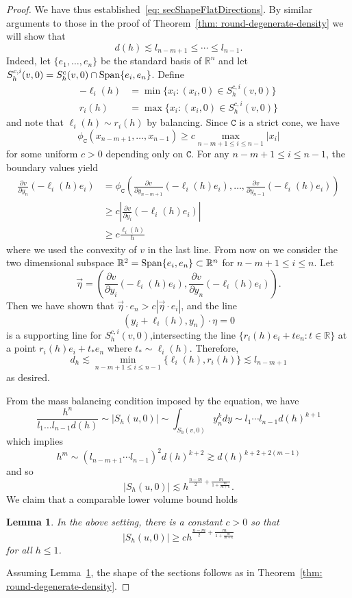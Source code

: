 \documentclass[12pt,reqno]{amsart}
\newtheorem{lem}{Lemma}[section]
\newcommand{\del}{\partial}
\numberwithin{equation}{section}
\begin{document}
\begin{proof}
We have thus established~\eqref{eq: secShapeFlatDirections}. By similar arguments to those in the proof of Theorem~\ref{thm: round-degenerate-density} we will show that
\[
d(h)\lesssim l_{n-m+1}\leq \cdots \leq l_{n-1}. \]
Indeed, let $\{e_1,\ldots, e_n\}$ be the standard basis of $\mathbb{R}^n$ and let $S_{h}^{c,i}(v,0) = S_{h}^{c}(v,0) \cap {\rm Span}\{e_i,e_n\}$.  Define
\[
\begin{aligned}
-\ell_i(h) &= \min \{x_i : (x_i,0)\in S_{h}^{c,i}(v,0)\}\\
r_i(h) &=\max \{x_i : (x_i,0)\in S_{h}^{c,i}(v,0)\}
\end{aligned}
\]
and note that $\ell_i(h) \sim r_i(h)$ by balancing. Since $\mathtt{C}$ is a strict cone, we have
\[
\phi_{\mathtt{C}}(x_{n-m+1}, \ldots, x_{n-1}) \geq c \max_{n-m+1\leq i \leq n-1} |x_i|
\]
for some uniform $c>0$ depending only on $\mathtt{C}$.  For any $n-m+1 \leq i \leq n-1$, the boundary values yield
\[
\begin{aligned}
\frac{\del v}{\del y_n}(-\ell_i(h)e_i) &= \phi_{\mathtt{C}}(\frac{\del v}{\del y_{n-m+1}}(-\ell_i(h)e_i), \ldots, \frac{\del v}{\del y_{n-1}}(-\ell_i(h)e_i)) \\
&\geq c|\frac{\del v}{\del y_i}(-\ell_i(h)e_i)|\\
& \geq c\frac{\ell_i(h)}{h}
\end{aligned}
\]
where we used the convexity of $v$ in the last line.  From now on we consider the two dimensional subspace $\mathbb{R}^{2} = {\rm Span}\{e_i, e_n\} \subset \mathbb{R}^{n}$ for $n-m+1 \leq i \leq n$.  Let
\[
\vec{\eta} = \left(\frac{\del v}{\del y_i}(-\ell_i(h)e_i),\frac{\del v}{\del y_n}(-\ell_i(h)e_i)\right).
\]
Then we have shown that $\vec{\eta}\cdot e_n >c |\vec{\eta} \cdot e_i|$, and the line
\[
(y_i+\ell_i(h), y_n)\cdot \eta =0
\]
is a supporting line for $S_{h}^{c,i}(v,0)$,intersecting the line $\{r_i(h)e_i+te_n: t\in \mathbb{R}\}$ at a point $r_i(h)e_i+t_*e_n$ where $t_* \sim \ell_i(h)$.  Therefore,
\[
d_h \lesssim \min_{n-m+1 \leq i \leq n-1}\{\ell_i(h), r_i(h)\} \lesssim l_{n-m+1}
\]
as desired.


From the mass balancing condition imposed by the equation, we have 
\[\frac{h^n}{l_1\dots l_{n-1}d(h)}\sim |S_h(u, 0)|\sim \int_{S_h(v, 0)}y_n^kdy \sim l_1\cdots l_{n-1}d(h)^{k+1}\]
which implies
\[h^m\sim (l_{n-m+1}\cdots l_{n-1})^2d(h)^{k+2} \gtrsim d(h)^{k+2+2(m-1)} \]
and so
\[
|S_{h}(u,0)| \lesssim h^{\frac{n-m}{2}+\frac{m}{1+\frac{m}{m+k}}}.
\]
We claim that a comparable lower volume bound holds 
\begin{lem}\label{lem: secVolLowBndMixed}
In the above setting, there is a constant $c>0$ so that
\begin{equation}\label{eq: SecVolMixHomog}
|S_h(u, 0)|\geq c h^{\frac{n-m}{2}+\frac{m}{1+\frac{m}{m+k}}}
\end{equation}
for all $h \leq 1$.
\end{lem}

\noindent Assuming Lemma~\ref{lem: secVolLowBndMixed}, the shape of the sections follows as in Theorem~\ref{thm: round-degenerate-density}.
\end{proof}
\end{document}
